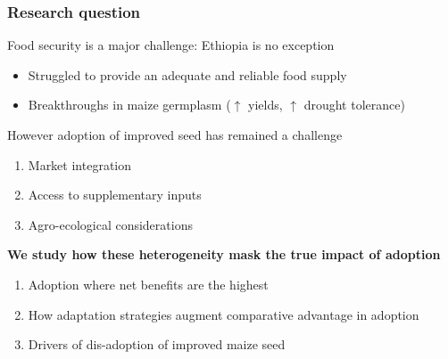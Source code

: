 \documentclass{beamer}
\begin{document}
\begin{frame}
\frametitle{Research question}

Food security is a major challenge: Ethiopia is no exception

\begin{itemize}
    \item Struggled to provide an adequate and reliable food supply
    \item Breakthroughs in maize germplasm ($\uparrow$ yields, $\uparrow$ drought tolerance)
\end{itemize}

However adoption of improved seed has remained a challenge

\begin{enumerate}
    \item Market integration
    \item Access to supplementary inputs
    \item Agro-ecological considerations
\end{enumerate}

\textbf{We study how these heterogeneity mask the true impact of adoption}

\begin{enumerate}
    \item Adoption where  net benefits are the highest
    \item How adaptation strategies augment comparative advantage in adoption
    \item Drivers of dis-adoption of improved maize seed
\end{enumerate}



 
\end{frame}
\end{document}
